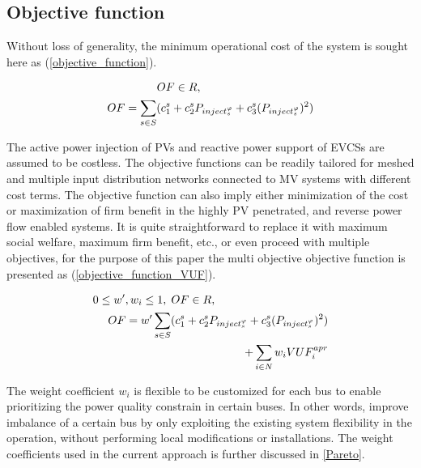 \documentclass[journal]{IEEEtran}
\begin{document}
\subsection{Objective function}

Without loss of generality, the minimum operational cost of the system is sought here as (\ref{objective_function}). 

\begin{equation}\label{objective_function}
\begin{split}
OF \in R, \hskip 100pt \\ \hskip 0.5pt OF=\displaystyle\sum_{s\in S} (c_1^s + c_2^s P_{inject_s^{\varphi}}+ c_3^s (P_{inject_s^{\varphi}})^2)
\end{split}
\end{equation}

The active power injection of PVs and reactive power support of EVCSs are assumed to be costless. The objective functions can be readily tailored for meshed and multiple input distribution networks connected to MV systems with different cost terms. The objective function can also imply either minimization of the cost or maximization of firm benefit in the highly PV penetrated, and reverse power flow enabled systems. It is quite straightforward to replace it with maximum social welfare, maximum firm benefit, etc., or even proceed with multiple objectives, for the purpose of this paper the multi objective objective function is presented as (\ref{objective_function_VUF}).

\begin{equation}\label{objective_function_VUF}
\begin{split}
0\leq w',w_i \leq1
 , \; OF \in R,  \hskip 100pt \\ \hskip 0.5pt OF=w'\displaystyle\sum_{s\in S} (c_1^s + c_2^s P_{inject_s^{\varphi}}+ c_3^s (P_{inject_s^{\varphi}})^2)
\\+\displaystyle\sum_{i\in N} w_iVUF_{i}^{apr}
\end{split}
\end{equation}

  The weight coefficient $w_i$ is flexible to be customized for each bus to enable prioritizing the power quality constrain in certain buses. In other words, improve imbalance of a certain bus by only exploiting the existing system flexibility in the operation, without performing local modifications or installations. The weight coefficients used in the current approach is further discussed in \ref{Pareto}.  
  
\end{document}
